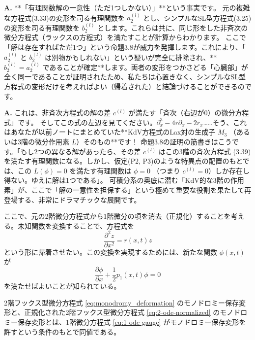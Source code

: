 \vspace{2em}

\begin{Q}
\textbf{A.} **「有理関数解の一意性（ただ1つしかない）」**という事実です。
元の複雑な方程式(3.33)の変形を司る有理関数を $a_2^{(l)}$ とし、シンプルなSL型方程式(3.25)の変形を司る有理関数を $b_2^{(l)}$ とします。これらは共に、同じ形をした非斉次の微分方程式（ラックスの方程式）を満たすことが計算からわかります。
ここで「解は存在すればただ1つ」という命題3.8が威力を発揮します。これにより、「$a_2^{(l)}$ と $b_2^{(l)}$ は別物かもしれない」という疑いが完全に排除され、**$b_2^{(l)} = a_2^{(l)}$ であることが確定**します。両者の変形をつかさどる「心臓部」が全く同一であることが証明されたため、私たちは心置きなく、シンプルなSL型方程式の変形だけを考えればよい（帰着された）と結論づけることができるのです。
\end{Q}

\begin{Q}
\textbf{A.} これは、非斉次方程式の解の差 $c^{(l)}$ が満たす「斉次（右辺が0）の微分方程式」です。
そしてこの式の左辺を見てください。$\partial_x^3 - 4r\partial_x - 2r_x$……そう、これはあなたが以前ノートにまとめていた**KdV方程式のLax対の生成子 $M_3$ （あるいは3階の微分作用素 $L$）そのもの**です！
命題3.8の証明の筋書きはこうです。「もし2つの異なる解があったら、その差 $c^{(l)}$ はこの3階の斉次方程式 (3.39) を満たす有理関数になる。しかし、仮定(P2, P3)のような特異点の配置のもとでは、この $L(\phi)=0$ を満たす有理関数は $\phi=0$ （つまり $c^{(l)}=0$）しか存在し得ない。ゆえに解は1つである」。
可積分系の奥底に潜む「KdV的な3階の作用素」が、ここで「解の一意性を担保する」という極めて重要な役割を果たして再登場する、非常にドラマチックな展開です。
\end{Q}

ここで、元の2階微分方程式から1階微分の項を消去（正規化）することを考える。未知関数を変換することで、方程式を
\begin{equation}\label{eq:2-ode-normalized}
\frac{\partial^{2}z}{\partial x^{2}} = r(x,t)z
\end{equation}
という形に帰着させたい。この変換を実現するためには、新たな関数 $\phi(x,t)$ が
\begin{equation}\label{eq:1-ode-gauge}
\frac{\partial \phi}{\partial x} + \frac{1}{2}p_{1}(x,t)\phi = 0
\end{equation}
を満たせばよいことが知られている。

\begin{proposition}\label{prop:equivalence_2_ode}
    2階フックス型微分方程式 \eqref{eq:monodromy_deformation} のモノドロミー保存変形と、正規化された2階フックス型微分方程式 \eqref{eq:2-ode-normalized} のモノドロミー保存変形とは、1階微分方程式 \eqref{eq:1-ode-gauge} がモノドロミー保存変形を許すという条件のもとで同値である。
\end{proposition}

